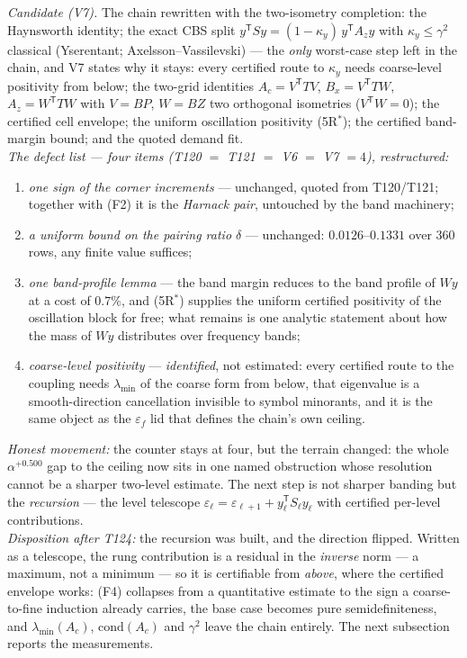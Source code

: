 \documentclass[11pt,a4paper]{article}
\begin{document}
\begin{keybox}
\emph{Candidate (V7).} The chain rewritten with the two-isometry completion: the Haynsworth
identity; the exact CBS split $y^{\mathsf T}Sy=(1-\kappa_y)\,y^{\mathsf T}A_zy$ with
$\kappa_y\le\gamma^2$ classical (Yserentant; Axelsson--Vassilevski) --- the \emph{only}
worst-case step left in the chain, and V7 states why it stays: every certified route to
$\kappa_y$ needs coarse-level positivity from below; the two-grid identities
$A_c=V^{\mathsf T}TV$, $B_x=V^{\mathsf T}TW$, $A_z=W^{\mathsf T}TW$ with $V=BP$, $W=BZ$ two
orthogonal isometries ($V^{\mathsf T}W=0$); the certified cell envelope; the uniform
oscillation positivity (5R$^*$); the certified band-margin bound; and the quoted demand
fit.\\[3pt]
\emph{The defect list --- four items (T120 $=$ T121 $=$ V6 $=$ V7 $=4$), restructured:}
\begin{enumerate}[leftmargin=1.6em]
\item[\textbf{(F1)}] \emph{one sign of the corner increments} --- unchanged, quoted from
T120/T121; together with (F2) it is the \emph{Harnack pair}, untouched by the band
machinery;
\item[\textbf{(F2)}] \emph{a uniform bound on the pairing ratio $\delta$} --- unchanged:
$0.0126$--$0.1331$ over $360$ rows, any finite value suffices;
\item[\textbf{(F3)}] \emph{one band-profile lemma} --- the band margin reduces to the band
profile of $Wy$ at a cost of $0.7\%$, and (5R$^*$) supplies the uniform certified positivity
of the oscillation block for free; what remains is one analytic statement about how the mass
of $Wy$ distributes over frequency bands;
\item[\textbf{(F4)}] \emph{coarse-level positivity} --- \emph{identified}, not estimated:
every certified route to the coupling needs $\lambda_{\min}$ of the coarse form from below,
that eigenvalue is a smooth-direction cancellation invisible to symbol minorants, and it is
the same object as the $\varepsilon_f$ lid that defines the chain's own ceiling.
\end{enumerate}
\emph{Honest movement:} the counter stays at four, but the terrain changed: the whole
$\alpha^{+0.500}$ gap to the ceiling now sits in one named obstruction whose resolution
cannot be a sharper two-level estimate. The next step is not sharper banding but the
\emph{recursion} --- the level telescope
$\varepsilon_\ell=\varepsilon_{\ell+1}+y_\ell^{\mathsf T}S_\ell y_\ell$ with certified
per-level contributions.\\[3pt]
\emph{Disposition after T124:} the recursion was built, and the direction flipped. Written as
a telescope, the rung contribution is a residual in the \emph{inverse} norm --- a maximum,
not a minimum --- so it is certifiable from \emph{above}, where the certified envelope works:
(F4) collapses from a quantitative estimate to the sign a coarse-to-fine induction already
carries, the base case becomes pure semidefiniteness, and $\lambda_{\min}(A_c)$,
$\mathrm{cond}(A_c)$ and $\gamma^2$ leave the chain entirely. The next subsection reports the
measurements.
\end{keybox}
\end{document}

